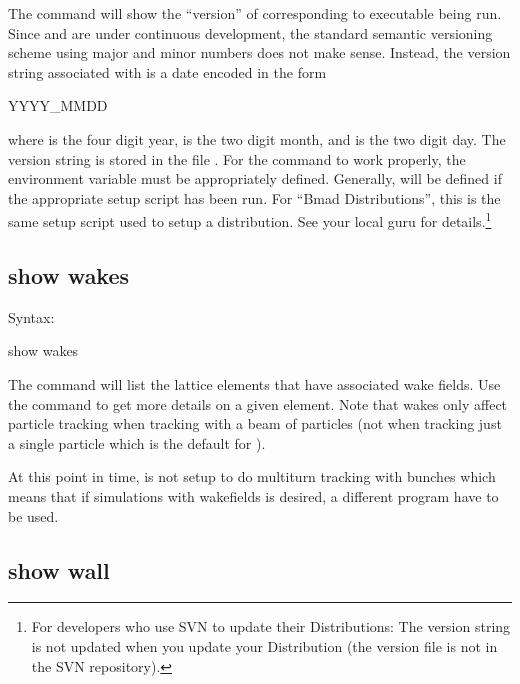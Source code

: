 {{{{{{{{{{The  command will show the ``version'' of \tao corresponding to \tao executable
being run. Since \bmad and \tao are under continuous development, the standard semantic versioning
scheme using major and minor numbers does not make sense. Instead, the version string associated
with \tao is a date encoded in the form
\begin{example}
  YYYY_MMDD
\end{example}
where  is the four digit year,  is the two digit month, and  is the two digit
day. The version string is stored in the file .  For the 
command to work properly, the environment variable  must be appropriately
defined. Generally,  will be defined if the appropriate \bmad setup script has been
run. For ``Bmad Distributions'', this is the same setup script used to setup a distribution. See
your local \bmad guru for details.\footnote
  {
For developers who use SVN to update their Distributions: The version string is not updated when
you update your Distribution (the version file is not in the SVN repository). 
  }


\subsection{show wakes}
\label{s:show.wakes}

Syntax:
\begin{example}
  show wakes 
\end{example}

The  command will list the lattice elements that have associated wake fields.  Use
the  command to get more details on a given element. Note that wakes only affect
particle tracking when tracking with a beam of particles (not when tracking just a single particle
which is the default for \tao).

At this point in time, \tao is not setup to do multiturn tracking with bunches which means that if
simulations with wakefields is desired, a different program have to be used.


\subsection{show wall}
\label{s:show.wall}

}}}}}}}}}}
